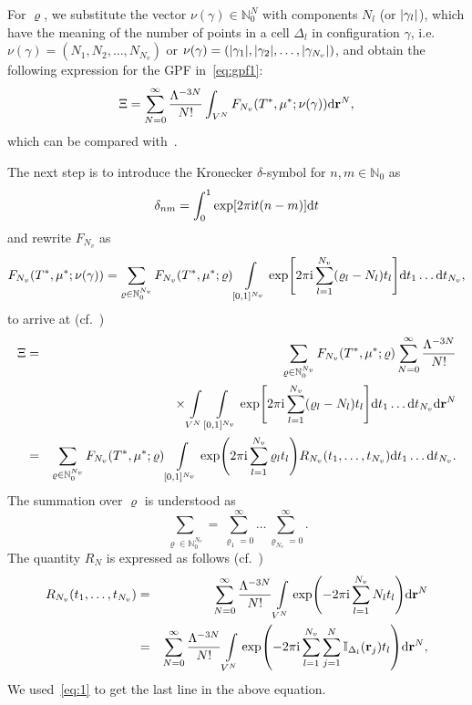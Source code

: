 \documentclass[12pt]{article}
\numberwithin{equation}{section}
\begin{document}
	For $\varrho$, we substitute the vector $\nu(\gamma) \in \mathbb{N}_0^N$ with components $N_l$ (or $\abs{\gamma_l}$), which have the meaning of the number of points in a cell $\Delta_{l}$ in configuration $\gamma$, i.e. $\nu(\gamma)=(N_1, N_2, \ldots, N_{N_v})$ or $\nu(\gamma) = (\abs{\gamma_1}, \abs{\gamma_2}, \ldots, \abs{\gamma_{N_v}})$, and obtain the following expression for the GPF in~\eqref{eq:gpf1}:
	\begin{equation}
		\Xi = \sum_{N=0}^{\infty} \frac{\Lambda^{-3N}}{N!}\int_{V^N} F_{N_v}(T^*,\mu^*;\nu(\gamma)) {\rm d} \vb{r}^N,
	\end{equation}
	which can be compared with~\cite[eq.~(2.8)]{KKD20}.
	
	The next step is to introduce the Kronecker $\delta$-symbol for $n, m \in \mathbb{N}_0$ as
	\begin{equation}
		\label{def:Kronecker}
		\delta_{nm} = \int_0^1 \exp[2\pi {\rm i} t (n-m)] {\rm d}t
	\end{equation}
	and rewrite $F_{N_v}$ as
	\begin{equation}
		F_{N_v}(T^*,\mu^*;\nu(\gamma)) = \sum_{\varrho \in \mathbb{N}_0^{N_v}} F_{N_v}(T^*, \mu^*;\varrho) 
		\int\limits_{[0,1]^{N_v}} \exp[2\pi{\rm i} \sum_{l=1}^{N_v} (\varrho_l - N_l)t_l ] {\rm d} t_1 \ldots {\rm d} t_{N_v},
	\end{equation}
	to arrive at (cf.~\cite[(2.9)]{KKD20})
	\begin{eqnarray}
		\label{eq:XiR}
		\Xi & = &  \sum_{\varrho \in \mathbb{N}_0^{N_v}} F_{N_v}(T^*, \mu^*; \varrho) 
		\sum_{N=0}^{\infty} \frac{\Lambda^{-3N}}{N!} 
		\nonumber\\
		&& \times \int\limits_{V^N} \int\limits_{[0,1]^{N_v}} 
		\exp[2\pi{\rm i} \sum_{l=1}^{N_v} (\varrho_l - N_l)t_l ] {\rm d} t_1 \ldots {\rm d} t_{N_v} {\rm d} \vb{r}^N 
		\nonumber\\
		& = & \sum_{\varrho \in \mathbb{N}_0^{N_v}} F_{N_v}(T^*, \mu^*; \varrho)
		\int\limits_{[0,1]^{N_v}} \exp(2\pi{\rm i} \sum_{l=1}^{N_v} \varrho_l t_l) R_{N_v}(t_1, \ldots, t_{N_v}) {\rm d} t_1 \ldots {\rm d} t_{N_v}.
	\end{eqnarray}
	The summation over $\varrho$ is understood as
	\begin{equation}
		\sum_{\varrho \in \mathbb{N}_0^{N_v}} = \sum_{\varrho_1=0}^{\infty} \ldots \sum_{\varrho_{N_v}=0}^{\infty}.
	\end{equation}
	The quantity $R_N$ is expressed as follows (cf.~\cite[(2.10)]{KKD20})
	\begin{eqnarray}
		\label{def:RN}
		R_{N_v}(t_1, \ldots, t_{N_v}) & = & \sum_{N=0}^{\infty} \frac{\Lambda^{-3N}}{N!} \int\limits_{V^N} \exp(-2\pi{\rm i} \sum_{l=1}^{N_v} N_l t_l) {\rm d} \vb{r}^N
		\nonumber\\
		&=& \sum_{N=0}^{\infty} \frac{\Lambda^{-3N}}{N!} \int\limits_{V^N} \exp(-2\pi{\rm i} \sum_{l=1}^{N_v} \sum_{j=1}^{N} \mathbb{I}_{\Delta_{l}}(\vb{r}_j) t_l) {\rm d} \vb{r}^N,
	\end{eqnarray}
	We used~\eqref{eq:1} to get the last line in the above equation.
	
\end{document}

